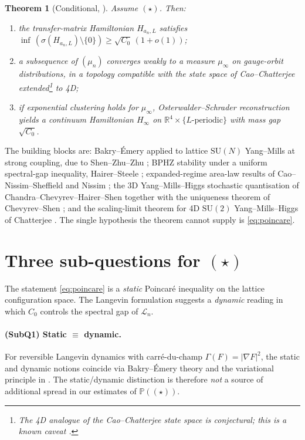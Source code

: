 \documentclass[11pt,a4paper]{amsart}
\newtheorem*{theoremnonum}{Theorem}
\theoremstyle{definition}
\theoremstyle{remark}
\begin{document}
\begin{theoremnonum}[Conditional, \cite{Remondiere2026G4memo}]
Assume \emph{$(\star)$}. Then:
\begin{enumerate}[label=(\roman*)]
\item the transfer-matrix Hamiltonian $H_{a_n,L}$ satisfies $\inf\,(\sigma(H_{a_n,L})\setminus\{0\})\ge \sqrt{C_0}\,(1+o(1))$;
\item a subsequence of $(\mu_n)$ converges weakly to a measure $\mu_\infty$ on gauge-orbit distributions, in a topology compatible with the state space of Cao--Chatterjee \cite{CaoChatterjee2024} extended\footnote{The 4D analogue of the Cao--Chatterjee state space is conjectural; this is a known caveat \cite{CaoChatterjee2024}.} to 4D;
\item if exponential clustering holds for $\mu_\infty$, Osterwalder--Schrader reconstruction \cite{GlimmJaffe1987} yields a continuum Hamiltonian $H_\infty$ on $\mathbb{R}^4\times\{L\text{-periodic}\}$ with mass gap $\sqrt{C_0}$.
\end{enumerate}
\end{theoremnonum}

The building blocks are: Bakry--\'Emery applied to lattice $\mathrm{SU}(N)$ Yang--Mills at strong coupling, due to Shen--Zhu--Zhu \cite{ShenZhuZhu2024}; BPHZ stability under a uniform spectral-gap inequality, Hairer--Steele \cite{HairerSteele2023}; expanded-regime area-law results of Cao--Nissim--Sheffield \cite{CaoNissimSheffield2025a, CaoNissimSheffield2025b} and Nissim \cite{Nissim2025}; the 3D Yang--Mills--Higgs stochastic quantisation of Chandra--Chevyrev--Hairer--Shen \cite{CCHS2022} together with the uniqueness theorem of Chevyrev--Shen \cite{ChevyrevShen2025}; and the scaling-limit theorem for 4D $\mathrm{SU}(2)$ Yang--Mills--Higgs of Chatterjee \cite{Chatterjee2024}. The single hypothesis the theorem cannot supply is \eqref{eq:poincare}.

\section{Three sub-questions for $(\star)$}\label{sec:subq}

The statement \eqref{eq:poincare} is a \emph{static} Poincar\'e inequality on the lattice configuration space. The Langevin formulation suggests a \emph{dynamic} reading in which $C_0$ controls the spectral gap of $\mathcal{L}_n$.

\paragraph{(SubQ1) Static $\equiv$ dynamic.} For reversible Langevin dynamics with carr\'e-du-champ $\Gamma(F) = |\nabla F|^2$, the static and dynamic notions coincide via Bakry--\'Emery theory \cite{BakryEmery1985} and the variational principle in \cite[\S XIII.12]{ReedSimonIV}. The static/dynamic distinction is therefore \emph{not} a source of additional spread in our estimates of $\mathbb{P}((\star))$.
\end{document}
